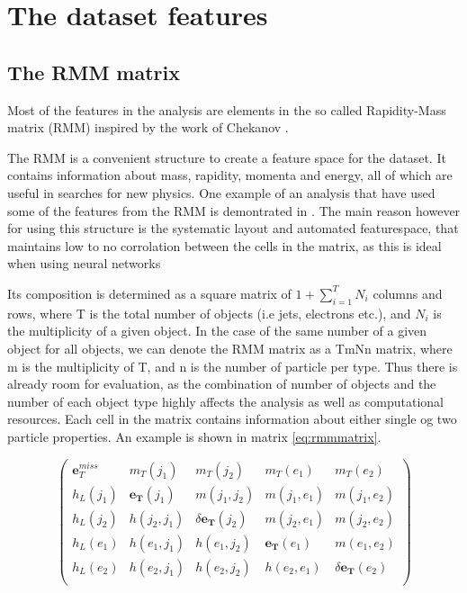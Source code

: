 \section{The dataset features}

\subsection*{The RMM matrix}
Most of the features in the analysis are elements in the so called Rapidity-Mass matrix (RMM)  inspired by the work of Chekanov \cite{Chekanov_2019}.
\par
The RMM is a convenient structure to create a feature space for the dataset. It contains information about mass, rapidity, momenta and energy, 
all of which are useful in searches for new physics\cite{Chekanov_2021}. One example of an analysis that have used some of the features from the RMM 
is demontrated in \cite{Santos_2017}. The main reason however for using this structure is the systematic layout and automated featurespace,
that maintains low to no corrolation between the cells in the matrix, as this is ideal when using neural networks
\par
Its composition is determined as a square matrix of $1 + \sum_{i=1}^{T}N_i$ columns and rows, where T is the total number of objects (i.e jets, 
electrons etc.), and $N_i$ is the multiplicity of a given object. In the case of the same number of a given object for all objects, we can 
denote the RMM matrix as a TmNn matrix, where m is the multiplicity of T, and n is the number of particle per type. Thus there is already 
room for evaluation, as the combination of number of objects and the number of each object type highly affects the analysis as well as 
computational resources. Each cell in the matrix contains information about either single og two particle properties. An example is 
shown in matrix \ref{eq:rmmmatrix}.

\begin{equation}\label{eq:rmmmatrix}
\begin{pmatrix}
    \boldsymbol{e}_{T}^{miss} & m_T(j_1) & m_T(j_2) &  m_T(e_1) &  m_T(e_2)\\
    h_L(j_1) & \boldsymbol{e_T}(j_1) & m(j_1, j_2) & m(j_1, e_1) & m(j_1, e_2)\\
    h_L(j_2) & h(j_2, j_1) & \delta \boldsymbol{e_T}(j_2)& m(j_2, e_1) & m(j_2, e_2)\\
    h_L(e_1) & h(e_1, j_1) & h(e_1, j_2) & \boldsymbol{e_T}(e_1) & m(e_1, e_2)\\
    h_L(e_2) & h(e_2, j_1) & h(e_2, j_2) & h(e_2, e_1) & \delta \boldsymbol{e_T}(e_2)\\
\end{pmatrix}
\end{equation}

